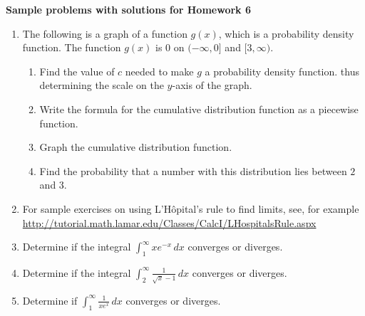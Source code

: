 \documentclass{article}
\begin{document}
\begin{center}
\textbf{
    Sample problems with solutions for Homework 6}
\end{center}
    \begin{enumerate}
               \item The following is a graph of a function $g(x)$, which is a probability density function. The function $g(x)$ is $0$ on $(-\infty,0]$ and $[3,\infty)$.
                        \begin{center}
        \end{center}
                \begin{enumerate}
                    \item Find the value of $c$ needed to make $g$ a probability density function. thus determining the scale on the $y$-axis of the graph.
                    \item Write the formula for the cumulative distribution function as a piecewise function.
                    \item Graph the cumulative distribution function.
                    \item Find the probability that a number with this distribution lies between $2$ and $3$.
                \end{enumerate} \item For sample exercises on using L'H\^{o}pital's rule to find limits, see, for example
                \url{http://tutorial.math.lamar.edu/Classes/CalcI/LHospitalsRule.aspx}
                \item Determine if the integral $\int_1^\infty xe^{-x}\,dx$ converges or diverges.
                \item Determine if the integral $\int_2^\infty \frac{1}{\sqrt{x}-1}\,dx$ converges or diverges.
                \item Determine if $\int_1^\infty \frac{1}{xe^x}\,dx$ converges or diverges.
    \end{enumerate}
\end{document}
